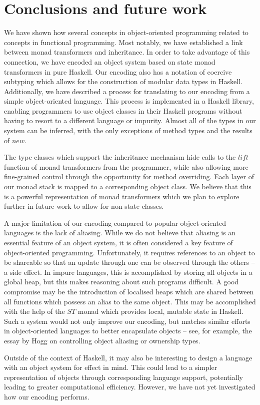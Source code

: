 \section{Conclusions and future work}
\label{sec:conclusions}

We have shown how several concepts in object-oriented programming related to concepts in functional programming. Most notably, we have established a link between monad transformers and inheritance. In order to take advantage of this connection, we have encoded an object system based on state monad transformers in pure Haskell. Our encoding also has a notation of coercive subtyping which allows for the construction of modular data types in Haskell. Additionally, we have described a process for translating to our encoding from a simple object-oriented language. This process is implemented in a Haskell library, enabling programmers to use object classes in their Haskell programs without having to resort to a different language or impurity. Almost all of the types in our system can be inferred, with the only exceptions of method types and the results of $\mathit{new}$.

The type classes which support the inheritance mechanism hide calls to the $\mathit{lift}$ function of monad transformers from the programmer, while also allowing more fine-grained control through the opportunity for method overriding. Each layer of our monad stack is mapped to a corresponding object class. We believe that this is a powerful representation of monad transformers which we plan to explore further in future work to allow for non-state classes.

A major limitation of our encoding compared to popular object-oriented languages is the lack of aliasing. While we do not believe that aliasing is an essential feature of an object system, it is often considered a key feature of object-oriented programming. Unfortunately, it requires references to an object to be shareable so that an update through one can be observed through the others -- a side effect. In impure languages, this is accomplished by storing all objects in a global heap, but this makes reasoning about such programs difficult. A good compromise may be the introduction of localised heaps which are shared between all functions which possess an alias to the same object. This may be accomplished with the help of the $\mathit{ST}$ monad \cite{launchbury1995state} which provides local, mutable state in Haskell. Such a system would not only improve our encoding, but matches similar efforts in object-oriented languages to better encapsulate objects -- see, for example, the essay by Hogg\cite{hogg1992geneva} on controlling object aliasing or ownership types\cite{clarke1998ownership}.

Outside of the context of Haskell, it may also be interesting to design a language with an object system for effect in mind. This could lead to a simpler representation of objects through corresponding language support, potentially leading to greater computational efficiency. However, we have not yet investigated how our encoding performs. 

